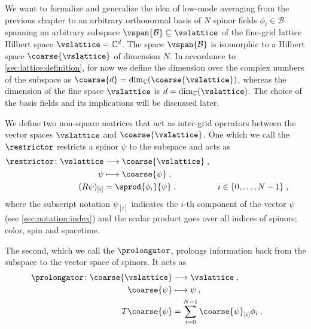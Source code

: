 We want to formalize and generalize the idea of low-mode averaging from the previous chapter to an arbitrary orthonormal basis of $N$ spinor fields $\phi_{i} \in \mathcal{B}$ spanning an arbitrary subspace $\vspan{\mathcal{B}} \subseteq \vslattice$ of the fine-grid lattice Hilbert space $\vslattice = \mathbb{C}^d$.
The space $\vspan{\mathcal{B}}$ is isomorphic to a Hilbert space $\coarse{\vslattice}$ of dimension $N$.
In accordance to \cref{sec:lattice:definition}, for now we define the dimension over the complex numbers of the subspace as $\coarse{d} = \dim_{\mathbb{C}}(\coarse{\vslattice})$, whereas the dimension of the fine space $\vslattice$ is $d = \dim_{\mathbb{C}}(\vslattice)$.
The choice of the basis fields and its implications will be discussed later.

We define two non-square matrices that act as inter-grid operators between the vector spaces $\vslattice$ and $\coarse{\vslattice}$.
One which we call the  $\restrictor$ restricts a spinor $\psi$ to the subspace and acts as
\begin{align}
&\begin{aligned}
\restrictor \colon
\vslattice &\longrightarrow \coarse{\vslattice} \;, \\
\psi       &\longmapsto     \coarse{\psi} \;, \\
(R \psi)_{[i]} &= \sprod{\phi_{i}}{\psi} \;,
& i &\in \{ 0, \ldots, N-1 \} \;,
\end{aligned} \label{eq:R}
\end{align}
where the subscript notation $\psi_{[i]}$ indicates the $i$-th component of the vector $\psi$ (see \cref{sec:notation:index}) and the scalar product goes over all indices of spinors; color, spin and spacetime.

The second, which we call the  $\prolongator$, prolongs information back from the subspace to the vector space of spinors.
It acts as
\begin{align}
&\begin{aligned}
\prolongator \colon
\coarse{\vslattice}  &\longrightarrow \vslattice \;, \\
\coarse{\psi}        &\longmapsto     \psi \;, \\
T \coarse{\psi} &= \sum_{i=0}^{N-1} \coarse{\psi}_{[i]} \phi_{i} \;. &
\end{aligned} \label{eq:T}
\end{align}

